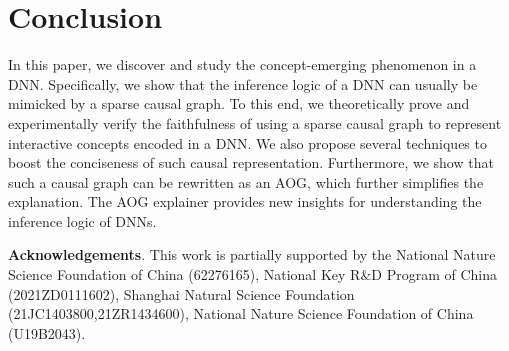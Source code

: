 \documentclass[10pt,twocolumn,letterpaper]{article}
\begin{document}
\begin{table}[t]
    \centering
    \vspace{-2pt}
    \vspace{-4pt}
    \caption{Jaccard similarity between two models. Two adversarially trained models were more similar than two normally trained ones.}
    \label{tab:exp-adv_IoU}
    \vspace{-9pt}
\end{table}



\section{Conclusion}
\label{sec:conclusion}

In this paper, we discover and study the concept-emerging phenomenon in a DNN.
Specifically, we show that the inference logic of a DNN can usually be mimicked by a sparse causal graph.
To this end, we theoretically prove and experimentally verify the faithfulness of using a sparse causal graph to represent interactive concepts encoded in a DNN.
We also propose several techniques to boost the conciseness of such causal representation.
Furthermore, we show that such a causal graph can be rewritten as an AOG, which further simplifies the explanation.
The AOG explainer provides new insights for understanding the inference logic of DNNs.


\textbf{Acknowledgements}.
This work is partially supported by the National Nature Science Foundation of China (62276165), National Key R$\&$D Program of China (2021ZD0111602), Shanghai Natural Science Foundation (21JC1403800,21ZR1434600), National Nature Science Foundation of China (U19B2043).


{\small


}



\end{document}
